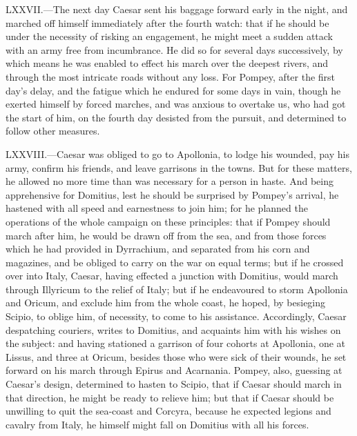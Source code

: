 LXXVII.—The next day Caesar sent his baggage forward early in the
night, and marched off himself immediately after the fourth watch: that
if he should be under the necessity of risking an engagement, he might
meet a sudden attack with an army free from incumbrance. He did so for
several days successively, by which means he was enabled to effect his
march over the deepest rivers, and through the most intricate roads
without any loss. For Pompey, after the first day's delay, and the
fatigue which he endured for some days in vain, though he exerted
himself by forced marches, and was anxious to overtake us, who had got
the start of him, on the fourth day desisted from the pursuit, and
determined to follow other measures.

LXXVIII.—Caesar was obliged to go to Apollonia, to lodge his wounded,
pay his army, confirm his friends, and leave garrisons in the towns. But
for these matters, he allowed no more time than was necessary for a
person in haste. And being apprehensive for Domitius, lest he should be
surprised by Pompey's arrival, he hastened with all speed and
earnestness to join him; for he planned the operations of the whole
campaign on these principles: that if Pompey should march after him, he
would be drawn off from the sea, and from those forces which he had
provided in Dyrrachium, and separated from his corn and magazines, and
be obliged to carry on the war on equal terms; but if he crossed over
into Italy, Caesar, having effected a junction with Domitius, would
march through Illyricum to the relief of Italy; but if he endeavoured to
storm Apollonia and Oricum, and exclude him from the whole coast, he
hoped, by besieging Scipio, to oblige him, of necessity, to come to his
assistance. Accordingly, Caesar despatching couriers, writes to
Domitius, and acquaints him with his wishes on the subject: and having
stationed a garrison of four cohorts at Apollonia, one at Lissus, and
three at Oricum, besides those who were sick of their wounds, he set
forward on his march through Epirus and Acarnania. Pompey, also,
guessing at Caesar's design, determined to hasten to Scipio, that if
Caesar should march in that direction, he might be ready to relieve him;
but that if Caesar should be unwilling to quit the sea-coast and
Corcyra, because he expected legions and cavalry from Italy, he himself
might fall on Domitius with all his forces.

